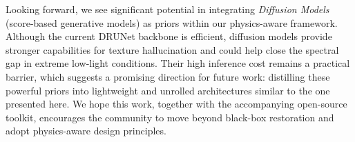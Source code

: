 \documentclass[10pt,journal,compsoc]{IEEEtran}
\begin{document}
Looking forward, we see significant potential in integrating \textit{Diffusion Models} (score-based generative models) as priors within our physics-aware framework. Although the current DRUNet backbone is efficient, diffusion models provide stronger capabilities for texture hallucination and could help close the spectral gap in extreme low-light conditions. Their high inference cost remains a practical barrier, which suggests a promising direction for future work: distilling these powerful priors into lightweight and unrolled architectures similar to the one presented here. We hope this work, together with the accompanying open-source toolkit, encourages the community to move beyond black-box restoration and adopt physics-aware design principles.




\end{document}
